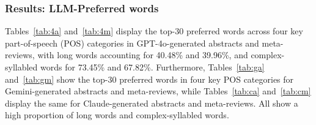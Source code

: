 

\subsubsection{Results: LLM-Preferred words}





Tables~\ref{tab:4a} and~\ref{tab:4m} display the top-30 preferred words across four key part-of-speech (POS) categories in GPT-4o-generated abstracts and meta-reviews, with long words accounting for 40.48\% and 39.96\%, and complex-syllabled words for 73.45\% and 67.82\%. Furthermore, Tables~\ref{tab:ga} and~\ref{tab:gm} show the top-30 preferred words in four key POS categories for Gemini-generated abstracts and meta-reviews, while Tables~\ref{tab:ca} and~\ref{tab:cm} display the same for Claude-generated abstracts and meta-reviews. All show a high proportion of long words and complex-syllabled words.









